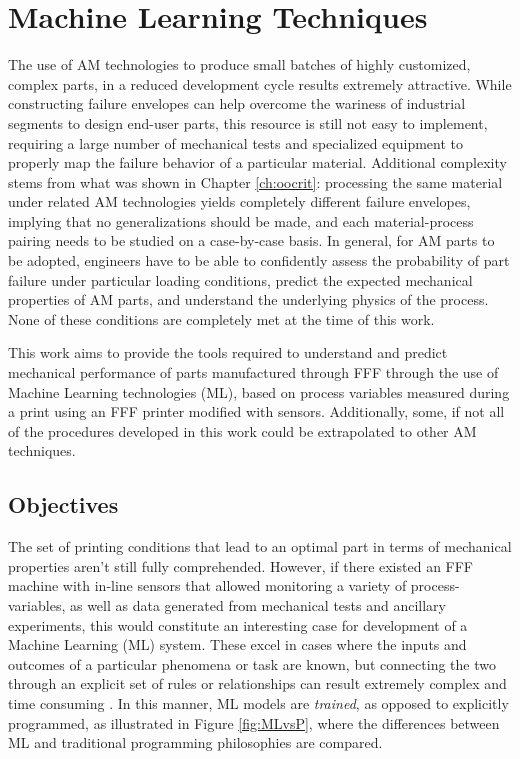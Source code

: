 \documentclass[main.tex]{subfiles}
\begin{document}
\chapter{Machine Learning Techniques} \label{ch:ml}

The use of AM technologies to produce small batches of highly customized, complex parts, in a reduced development cycle results extremely attractive. While constructing failure envelopes can help overcome the wariness of industrial segments to design end-user parts, this resource is still not easy to implement, requiring a large number of mechanical tests and specialized equipment to properly map the failure behavior of a particular material. Additional complexity stems from what was shown in Chapter \ref{ch:oocrit}: processing the same material under related AM technologies yields completely different failure envelopes, implying that no generalizations should be made, and each material-process pairing needs to be studied on a case-by-case basis. In general, for AM parts to be adopted, engineers have to be able to confidently assess the probability of part failure under particular loading conditions, predict the expected mechanical properties of AM parts, and understand the underlying physics of the process. None of these conditions are completely met at the time of this work.

This work aims to provide the tools required to understand and predict mechanical performance of parts manufactured through FFF through the use of Machine Learning technologies (ML), based on process variables measured during a print using an FFF printer modified with sensors. Additionally, some, if not all of the procedures developed in this work could be extrapolated to other AM techniques.

\section{Objectives} \label{sec:objectives}

The set of printing conditions that lead to an optimal part in terms of mechanical properties aren't still fully comprehended. However, if there existed an FFF machine with in-line sensors that allowed monitoring a variety of process-variables, as well as data generated from mechanical tests and ancillary experiments, this would constitute an interesting case for development of a Machine Learning (ML) system. These excel in cases where the inputs and outcomes of a particular phenomena or task are known, but connecting the two through an explicit set of rules or relationships can result extremely complex and time consuming \cite{Chollet2018}. In this manner, ML models are \emph{trained}, as opposed to explicitly programmed, as illustrated in Figure \ref{fig:MLvsP}, where the differences between ML and traditional programming philosophies are compared. 
\end{document}

